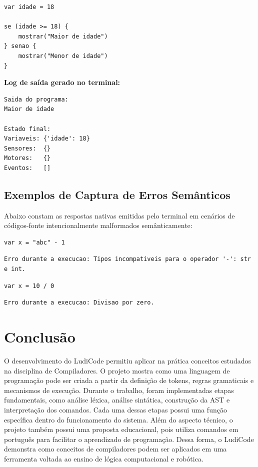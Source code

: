 \documentclass[12pt,a4paper]{article}
\begin{document}
\begin{lstlisting}[caption={tests/teste\_se.ludi}]
var idade = 18

se (idade >= 18) {
    mostrar("Maior de idade")
} senao {
    mostrar("Menor de idade")
}
\end{lstlisting}

\textbf{Log de saída gerado no terminal:}
\begin{lstlisting}[language={}, numbers=none, frame=single, caption={Saída do console para desvio condicional}]
Saida do programa:
Maior de idade

Estado final:
Variaveis: {'idade': 18}
Sensores:  {}
Motores:   {}
Eventos:   []
\end{lstlisting}

\subsection{Exemplos de Captura de Erros Semânticos}

Abaixo constam as respostas nativas emitidas pelo terminal em cenários de códigos-fonte intencionalmente malformados semânticamente:

\begin{lstlisting}[caption={tests/teste\_tipos.ludi}]
var x = "abc" - 1
\end{lstlisting}
\begin{lstlisting}[language={}, numbers=none, frame=single, caption={Log de erro para tipos incompatíveis}]
Erro durante a execucao: Tipos incompativeis para o operador '-': str e int.
\end{lstlisting}

\begin{lstlisting}[caption={tests/teste\_divisao\_zero.ludi}]
var x = 10 / 0
\end{lstlisting}
\begin{lstlisting}[language={}, numbers=none, frame=single, caption={Log de erro para divisão por zero}]
Erro durante a execucao: Divisao por zero.
\end{lstlisting}

\section{Conclusão}

O desenvolvimento do LudiCode permitiu aplicar na prática conceitos estudados na disciplina de Compiladores. O projeto mostra como uma linguagem de programação pode ser criada a partir da definição de tokens, regras gramaticais e mecanismos de execução. Durante o trabalho, foram implementadas etapas fundamentais, como análise léxica, análise sintática, construção da AST e interpretação dos comandos. Cada uma dessas etapas possui uma função específica dentro do funcionamento do sistema.
Além do aspecto técnico, o projeto também possui uma proposta educacional, pois utiliza comandos em português para facilitar o aprendizado de programação. Dessa forma, o LudiCode demonstra como conceitos de compiladores podem ser aplicados em uma ferramenta voltada ao ensino de lógica computacional e robótica.
\end{document}
